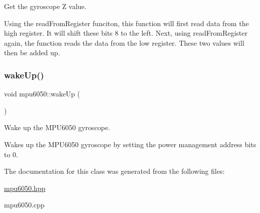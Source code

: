 Get the gyroscope Z value. 

Using the read\+From\+Register funciton, this function will first read data from the high register. It will shift these bits 8 to the left. Next, using read\+From\+Register again, the function reads the data from the low register. These two values will then be added up. \mbox{\label{classmpu6050_abf7874fc328913b17c22c86f3a01ee6e}} 
\subsubsection{\texorpdfstring{wake\+Up()}{wakeUp()}}
{\footnotesize\ttfamily void mpu6050\+::wake\+Up (\begin{DoxyParamCaption}{ }\end{DoxyParamCaption})}



Wake up the M\+P\+U6050 gyroscope. 

Wakes up the M\+P\+U6050 gyroscope by setting the power management address bits to 0. 

The documentation for this class was generated from the following files\+:\begin{DoxyCompactItemize}
\item 
\hyperlink{mpu6050_8hpp}{mpu6050.\+hpp}\item 
mpu6050.\+cpp\end{DoxyCompactItemize}
